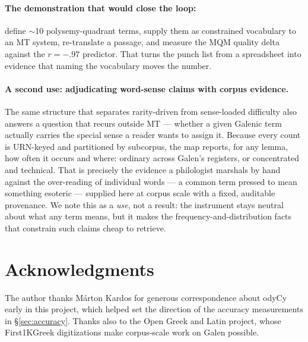 \documentclass[11pt]{article}
\begin{document}
\paragraph{The demonstration that would close the loop:}
define ${\sim}$10 polysemy-quadrant terms, supply them as
constrained vocabulary to an MT system, re-translate a passage, and measure the MQM quality delta
against the $r = -.97$ predictor. That turns the punch list from a spreadsheet into evidence that
naming the vocabulary moves the number.

\paragraph{A second use: adjudicating word-sense claims with corpus evidence.}
The same structure that separates rarity-driven from sense-loaded difficulty also answers a question
that recurs outside MT --- whether a given Galenic term actually carries the special sense a reader
wants to assign it. Because every count is URN-keyed and partitioned by subcorpus, the map reports,
for any lemma, how often it occurs and where: ordinary across Galen's registers, or concentrated and
technical. That is precisely the evidence a philologist marshals by hand against the over-reading of
individual words --- a common term pressed to mean something esoteric --- supplied here at corpus
scale with a fixed, auditable provenance. We note this as a \textit{use}, not a result: the instrument
stays neutral about what any term means, but it makes the frequency-and-distribution facts that
constrain such claims cheap to retrieve.

\section*{Acknowledgments}

The author thanks M\'arton Kardos for generous correspondence about odyCy early in this
project, which helped set the direction of the accuracy measurements in \S\ref{sec:accuracy}.
Thanks also to the Open Greek and Latin project, whose First1KGreek digitizations make
corpus-scale work on Galen possible.


\end{document}
